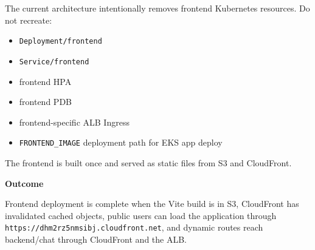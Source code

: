 The current architecture intentionally removes frontend Kubernetes
resources. Do not recreate:

\begin{itemize}
\tightlist
\item
  \texttt{Deployment/\allowbreak{}frontend}
\item
  \texttt{Service/\allowbreak{}frontend}
\item
  frontend HPA
\item
  frontend PDB
\item
  frontend-specific ALB Ingress
\item
  \texttt{FRONTEND\_\allowbreak{}IMAGE} deployment path for EKS app deploy
\end{itemize}

The frontend is built once and served as static files from S3 and
CloudFront.

\vspace{0.5em}\noindent\textbf{Outcome}\par

Frontend deployment is complete when the Vite build is in S3, CloudFront
has invalidated cached objects, public users can load the application
through \texttt{https:/\allowbreak{}/\allowbreak{}dhm2rz5nmsibj.\allowbreak{}cloudfront.\allowbreak{}net}, and dynamic
routes reach backend/chat through CloudFront and the ALB.
